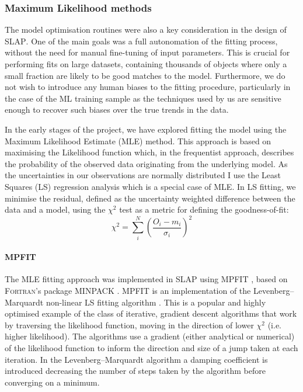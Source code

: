 \subsubsection{Maximum Likelihood methods}
The model optimisation routines were also a key consideration in the design of \textsc{SLAP}. One of the main goals was a full autonomation of the fitting process, without the need for manual fine-tuning of input parameters. This is crucial for performing fits on large datasets, containing thousands of objects where only a small fraction are likely to be good matches to the model. Furthermore, we do not wish to introduce any human biases to the fitting procedure, particularly in the case of the ML training sample as the techniques used by us are sensitive enough to recover such biases over the true trends in the data.

In the early stages of the project, we have explored fitting the model using the Maximum Likelihood Estimate (MLE) method. This approach is based on maximising the Likelihood function which, in the frequentist approach, describes the probability of the observed data originating from the underlying model. As the uncertainties in our observations are normally distributed I use the Least Squares (LS) regression analysis which is a special case of MLE. In LS fitting, we minimise the residual, defined as the uncertainty weighted difference between the data and a model, using the $\chi^{2}$ test as a metric for defining the goodness-of-fit:
\begin{equation}
  \chi^2 = \sum\limits_i^N \left( \frac{O_i - m_i}{\sigma_i} \right)^2
\end{equation}

\paragraph{MPFIT} \label{sec:MPFIT}
The MLE fitting approach was implemented in \textsc{SLAP} using \textsc{MPFIT} \citep{ Markwardt2008}, based on \textsc{Fortran}'s package \textsc{MINPACK} \citep{More1980}. \textsc{MPFIT} is an implementation of the Levenberg–Marquardt non-linear LS fitting algorithm \citep{Levenberg1944,Marquardt1963}. This is a popular and highly optimised example of the class of iterative, gradient descent algorithms that work by traversing the likelihood function, moving in the direction of lower $\chi^2$ (i.e. higher likelihood). The algorithms use a gradient (either analytical or numerical) of the likelihood function to inform the direction and size of a jump taken at each iteration. In the Levenberg–Marquardt algorithm a damping coefficient is introduced decreasing the number of steps taken by the algorithm before converging on a minimum.

